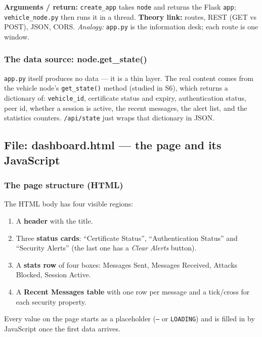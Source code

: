 \documentclass[11pt,a4paper]{article}
\begin{document}
\textbf{Arguments / return:} \texttt{create\_app} takes \texttt{node} and returns
the Flask \texttt{app}; \texttt{vehicle\_node.py} then runs it in a thread.
\textbf{Theory link:} routes, REST (GET vs POST), JSON, CORS.
\emph{Analogy:} \texttt{app.py} is the information desk; each route is one
window.

\subsubsection*{The data source: node.get\_state()}
\texttt{app.py} itself produces no data --- it is a thin layer. The real content
comes from the vehicle node's \texttt{get\_state()} method (studied in S6), which
returns a dictionary of: \texttt{vehicle\_id}, certificate status and expiry,
authentication status, peer id, whether a session is active, the recent messages,
the alert list, and the statistics counters. \texttt{/api/state} just wraps that
dictionary in JSON.

\subsection{File: dashboard.html --- the page and its JavaScript}

\subsubsection*{The page structure (HTML)}
The HTML body has four visible regions:
\begin{enumerate}
  \item A \textbf{header} with the title.
  \item Three \textbf{status cards}: ``Certificate Status'', ``Authentication
        Status'' and ``Security Alerts'' (the last one has a \emph{Clear Alerts}
        button).
  \item A \textbf{stats row} of four boxes: Messages Sent, Messages Received,
        Attacks Blocked, Session Active.
  \item A \textbf{Recent Messages table} with one row per message and a tick/cross
        for each security property.
\end{enumerate}
Every value on the page starts as a placeholder (\texttt{--} or \texttt{LOADING})
and is filled in by JavaScript once the first data arrives.
\end{document}
